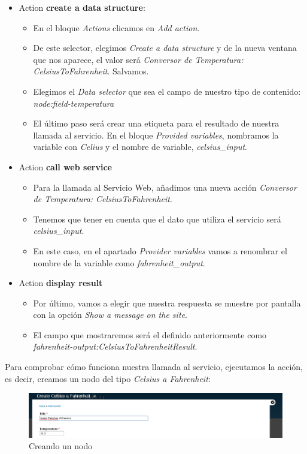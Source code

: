 \begin{itemize}
  \item Action \textbf{create a data structure}:
  \begin{itemize}
    \item En el bloque \textit{Actions} clicamos en \textit{Add action}.
    \item De este selector, elegimos \textit{Create a data structure} y de la nueva ventana que nos aparece, 
    	el valor será \textit{Conversor de Temperatura: CelsiusToFahrenheit}. Salvamos.
  	\item Elegimos el \textit{Data selector} que sea el campo de nuestro tipo de contenido: \textit{node:field-temperatura}
	\item El último paso será crear una etiqueta para el resultado de nuestra llamada al servicio. En el 
    	 bloque \textit{Provided variables}, nombramos la variable con \textit{Celius} y el nombre de variable, \textit{celsius\_input}.
    \end{itemize}
  \item Action \textbf{call web service}
  \begin{itemize}
    \item Para la llamada al Servicio Web, añadimos una nueva acción \textit{Conversor de Temperatura: CelsiusToFahrenheit}.
    \item Tenemos que tener en cuenta que el dato que utiliza el servicio será \textit{celsius\_input}. 
    \item En este caso, en el apartado \textit{Provider variables} vamos a renombrar el nombre de la variable como 
    \textit{fahrenheit\_output}.
  \end{itemize}
  \item Action \textbf{display result}
  \begin{itemize}
    \item Por último, vamos a elegir que nuestra respuesta se muestre por pantalla con la opción \textit{Show a message on the site}.
    \item El campo que mostraremos será el definido anteriormente como \textit{fahrenheit-output:CelsiusToFahrenheitResult}.
  \end{itemize}
\end{itemize}

Para comprobar cómo funciona nuestra llamada al servicio, ejecutamos la acción, es decir, creamos un nodo del 
tipo \textit{Celsius a Fahrenheit}:

\begin{figure}
  \centering
    \includegraphics[width=1\textwidth]{Assets/Soap/Imagenes/crear_nodo.png}
  \caption{Creando un nodo}
\end{figure}

